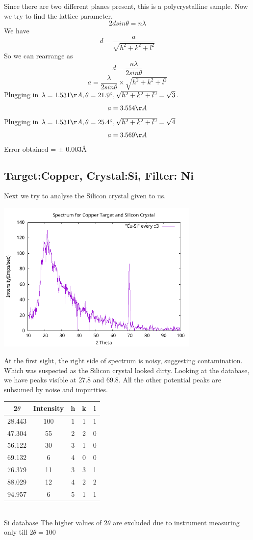 \documentclass[]{report}[12 pt]
\begin{document}
Since there are two different planes present, this is a polycrystalline sample. Now we try to find the lattice parameter.
	\begin{equation*}
	2dsin\theta=n\lambda
\end{equation*}
We have 
\[d=\frac{a}{\sqrt{h^2+k^2+l^2}}\]
So we can rearrange as
\[d=\frac{n\lambda}{2sin\theta}\]
\[a=\frac{\lambda}{2sin\theta}\times\sqrt{h^2+k^2+l^2}\]
Plugging in $\lambda=1.531{\AA}, \theta=21.9^{\circ}, \sqrt{h^2+k^2+l^2} =\sqrt{3}$.
\[a=3.554{\AA}\]
Plugging in $\lambda=1.531{\AA}, \theta=25.4^{\circ}, \sqrt{h^2+k^2+l^2} =\sqrt{4}$
\[a=3.569{\AA}\]
Error obtained = $\pm$ 0.003{\AA}
\subsection*{Target:Copper, Crystal:Si, Filter: Ni}
Next we try to analyse the Silicon crystal given to us.
\begin{center}
	\includegraphics[width=10cm]{cusi.png}
\end{center}
At the first sight, the right side of spectrum is noisy, suggesting contamination. Which was suspected as the Silicon crystal looked dirty. Looking at the database, we have peaks visible at 27.8 and 69.8. All the other potential peaks are subsumed by noise and impurities.\\
\begin{center}
	\begin{tabular}{|c|c|c|c|c|}
		\hline
		2$\theta$ & Intensity & h & k & l \\
		\hline
		28.443 & 100 & 1 & 1 & 1 \\
		\hline
		47.304 & 55 & 2 & 2 & 0 \\
		\hline
		56.122 & 30 & 3 & 1 & 0 \\
		\hline
		69.132 & 6 & 4 & 0 & 0 \\
		\hline
		76.379 & 11 & 3 & 3 & 1 \\
		\hline
		88.029 & 12 & 4 & 2 & 2 \\
		\hline
		 94.957 & 6 & 5 & 1 & 1 \\
		\hline
	\end{tabular}\\
	Si database
	The higher values of $2\theta$ are excluded due to instrument measuring only till $2\theta=100$
\end{center}
\end{document}
